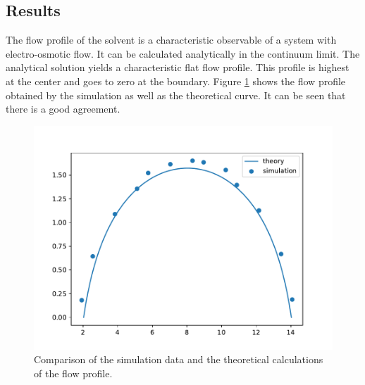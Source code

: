 \subsection{Results}
The flow profile of the solvent is a characteristic observable of a system with electro-osmotic flow. It can be calculated analytically in the continuum limit. The analytical solution yields a characteristic flat flow profile. This profile is highest at the center and goes to zero at the boundary. Figure \ref{fig:slit_plot} shows the flow profile obtained by the simulation as well as the theoretical curve. It can be seen that there is a good agreement.

\begin{figure}[H]
	\centering
	\includegraphics[width=\columnwidth]{slit_pore/prodrun_figs/fp}
	\captionsetup{width=\columnwidth}
	\caption{Comparison of the simulation data and the theoretical calculations of the flow profile.}
	\label{fig:slit_plot}
\end{figure}

